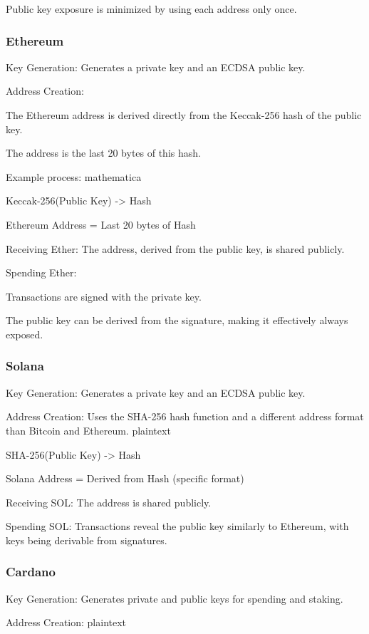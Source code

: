 \documentclass[11pt]{article}
\begin{document}
Public key exposure is minimized by using each address only once.


\subsubsection{Ethereum}

Key Generation: Generates a private key and an ECDSA public key.


Address Creation:


The Ethereum address is derived directly from the Keccak-256 hash of the public key.


The address is the last 20 bytes of this hash.


Example process:
mathematica


Keccak-256(Public Key) -> Hash


Ethereum Address = Last 20 bytes of Hash


Receiving Ether: The address, derived from the public key, is shared publicly.


Spending Ether:


Transactions are signed with the private key.


The public key can be derived from the signature, making it effectively always exposed.


\subsubsection{Solana}

Key Generation: Generates a private key and an ECDSA public key.


Address Creation: Uses the SHA-256 hash function and a different address format than Bitcoin and Ethereum.
plaintext


SHA-256(Public Key) -> Hash


Solana Address = Derived from Hash (specific format)


Receiving SOL: The address is shared publicly.


Spending SOL: Transactions reveal the public key similarly to Ethereum, with keys being derivable from signatures.


\subsubsection{Cardano}

Key Generation: Generates private and public keys for spending and staking.


Address Creation:
plaintext
\end{document}
